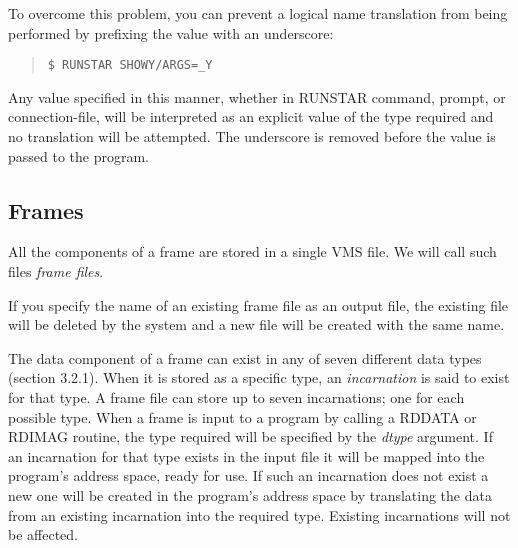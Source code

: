 \begin{description}
To overcome this problem, you can prevent a logical name translation from being
performed by prefixing the value with an underscore:
\begin{quote}
{\tt \$ RUNSTAR SHOWY/ARGS=\_Y}
\end{quote}
Any value specified in this manner, whether in RUNSTAR command, prompt, or
connection-file, will be interpreted as an explicit value of the type required
and no translation will be attempted.
The underscore is removed before the value is passed to the program.
\end{description}
\subsection {Frames}
All the components of a frame are stored in a single VMS file.
We will call such files {\em frame files}.

If you specify the name of an existing frame file as an output file,
the existing file will be deleted by the system and a new file will be created
with the same name.

The data component of a frame can exist in any of seven different data types
(section 3.2.1).
When it is stored as a specific type, an {\em incarnation} is said to exist for that
type.
A frame file can store up to seven incarnations; one for each possible type.
When a frame is input to a program by calling a RDDATA or RDIMAG routine, the
type required will be specified by the {\em dtype} argument.
If an incarnation for that type exists in the input file it will be mapped into
the program's address space, ready for use.
If such an incarnation does not exist a new one will be created in the
program's address space by translating the data from an existing incarnation
into the required type.
Existing incarnations will not be affected.

